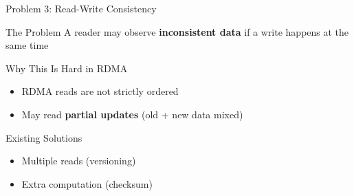 \documentclass[aspectratio=169,10pt]{beamer}
\begin{document}
\begin{frame}{Problem 3: Read-Write Consistency}

\begin{block}{The Problem}
A reader may observe \textbf{inconsistent data} if a write happens at the same time
\end{block}

\vspace{0.2cm}

\begin{alertblock}{Why This Is Hard in RDMA}
\begin{itemize}
    \item RDMA reads are not strictly ordered
    \item May read \textbf{partial updates} (old + new data mixed)
\end{itemize}
\end{alertblock}

\vspace{0.2cm}

\begin{block}{Existing Solutions}
\begin{itemize}
    \item Multiple reads (versioning)
    \item Extra computation (checksum)
\end{itemize}
\end{block}

\end{frame}
\end{document}
